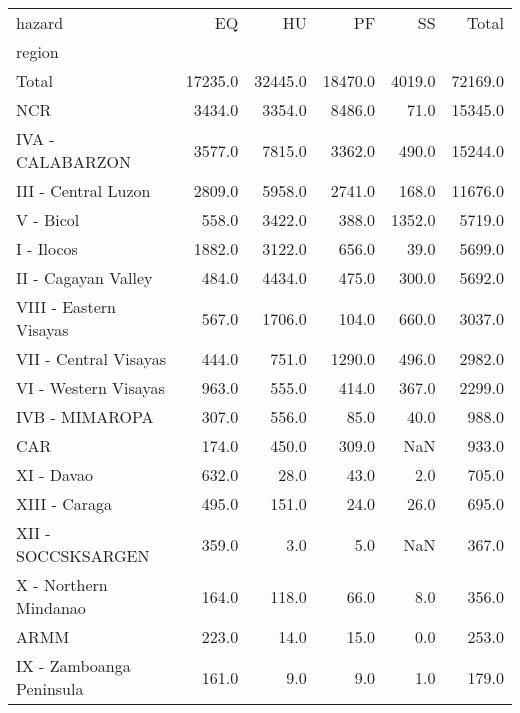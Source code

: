 \begin{tabular}{lrrrrr}
\toprule
hazard &       EQ &       HU &       PF &      SS &    Total \\
region                   &          &          &          &         &          \\
\midrule
Total                    &  17235.0 &  32445.0 &  18470.0 &  4019.0 &  72169.0 \\
NCR                      &   3434.0 &   3354.0 &   8486.0 &    71.0 &  15345.0 \\
IVA - CALABARZON         &   3577.0 &   7815.0 &   3362.0 &   490.0 &  15244.0 \\
III - Central Luzon      &   2809.0 &   5958.0 &   2741.0 &   168.0 &  11676.0 \\
V - Bicol                &    558.0 &   3422.0 &    388.0 &  1352.0 &   5719.0 \\
I - Ilocos               &   1882.0 &   3122.0 &    656.0 &    39.0 &   5699.0 \\
II - Cagayan Valley      &    484.0 &   4434.0 &    475.0 &   300.0 &   5692.0 \\
VIII - Eastern Visayas   &    567.0 &   1706.0 &    104.0 &   660.0 &   3037.0 \\
VII - Central Visayas    &    444.0 &    751.0 &   1290.0 &   496.0 &   2982.0 \\
VI - Western Visayas     &    963.0 &    555.0 &    414.0 &   367.0 &   2299.0 \\
IVB - MIMAROPA           &    307.0 &    556.0 &     85.0 &    40.0 &    988.0 \\
CAR                      &    174.0 &    450.0 &    309.0 &     NaN &    933.0 \\
XI - Davao               &    632.0 &     28.0 &     43.0 &     2.0 &    705.0 \\
XIII - Caraga            &    495.0 &    151.0 &     24.0 &    26.0 &    695.0 \\
XII - SOCCSKSARGEN       &    359.0 &      3.0 &      5.0 &     NaN &    367.0 \\
X - Northern Mindanao    &    164.0 &    118.0 &     66.0 &     8.0 &    356.0 \\
ARMM                     &    223.0 &     14.0 &     15.0 &     0.0 &    253.0 \\
IX - Zamboanga Peninsula &    161.0 &      9.0 &      9.0 &     1.0 &    179.0 \\
\bottomrule
\end{tabular}

